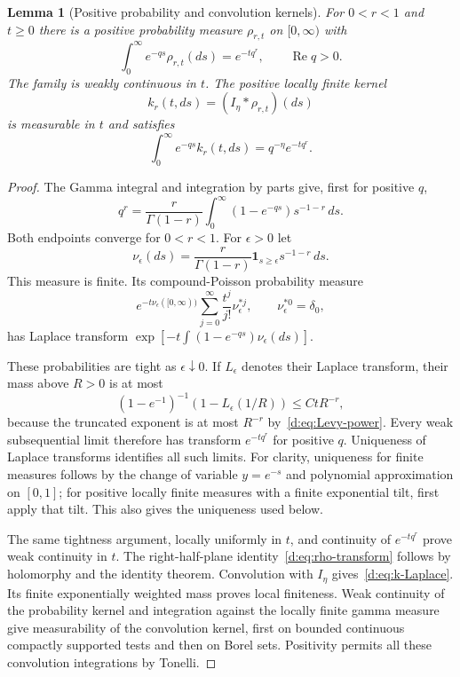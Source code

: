 \documentclass[11pt,a4paper]{article}
\numberwithin{equation}{section}
\newtheorem{lemma}[theorem]{Lemma}
\theoremstyle{definition}\newtheorem{definition}[theorem]{Definition}
\theoremstyle{remark}\newtheorem{remark}[theorem]{Remark}
\begin{document}
\begin{lemma}[Positive probability and convolution kernels]\label{d:lem:positive-kernel}
For $0<r<1$ and $t\ge0$ there is a positive probability measure $\rho_{r,t}$ on $[0,\infty)$ with
\begin{equation}\label{d:eq:rho-transform}
 \int_0^\infty e^{-qs}\rho_{r,t}(ds)=e^{-tq^r},
 \qquad \operatorname{Re}q>0.
\end{equation}
The family is weakly continuous in $t$. The positive locally finite kernel
\begin{equation}\label{d:eq:k-definition}
 k_r(t,ds)=(I_\eta*\rho_{r,t})(ds)
\end{equation}
is measurable in $t$ and satisfies
\begin{equation}\label{d:eq:k-Laplace}
 \int_0^\infty e^{-qs}k_r(t,ds)=q^{-\eta}e^{-tq^r}.
\end{equation}
\end{lemma}
\begin{proof}
The Gamma integral and integration by parts give, first for positive $q$,
\begin{equation}\label{d:eq:Levy-power}
 q^r=\frac r{\Gamma(1-r)}
      \int_0^\infty(1-e^{-qs})s^{-1-r}\,ds.
\end{equation}
Both endpoints converge for $0<r<1$. For $\epsilon>0$ let
\[
 \nu_\epsilon(ds)=\frac r{\Gamma(1-r)}
           \boldsymbol1_{s\ge\epsilon}s^{-1-r}\,ds.
\]
This measure is finite. Its compound-Poisson probability measure
\[
 e^{-t\nu_\epsilon([0,\infty))}
 \sum_{j=0}^\infty\frac{t^j}{j!}\nu_\epsilon^{*j},
 \qquad \nu_\epsilon^{*0}=\delta_0,
\]
has Laplace transform
$\exp[-t\int(1-e^{-qs})\nu_\epsilon(ds)]$.

These probabilities are tight as $\epsilon\downarrow0$. If $L_\epsilon$ denotes their Laplace transform, their mass above $R>0$ is at most
\[
 (1-e^{-1})^{-1}(1-L_\epsilon(1/R))
 \le C tR^{-r},
\]
because the truncated exponent is at most $R^{-r}$ by~\eqref{d:eq:Levy-power}. Every weak subsequential limit therefore has transform $e^{-tq^r}$ for positive $q$. Uniqueness of Laplace transforms identifies all such limits. For clarity, uniqueness for finite measures follows by the change of variable $y=e^{-s}$ and polynomial approximation on $[0,1]$; for positive locally finite measures with a finite exponential tilt, first apply that tilt. This also gives the uniqueness used below.

The same tightness argument, locally uniformly in $t$, and continuity of $e^{-tq^r}$ prove weak continuity in $t$. The right-half-plane identity~\eqref{d:eq:rho-transform} follows by holomorphy and the identity theorem. Convolution with $I_\eta$ gives~\eqref{d:eq:k-Laplace}. Its finite exponentially weighted mass proves local finiteness. Weak continuity of the probability kernel and integration against the locally finite gamma measure give measurability of the convolution kernel, first on bounded continuous compactly supported tests and then on Borel sets. Positivity permits all these convolution integrations by Tonelli.
\end{proof}
\end{document}
